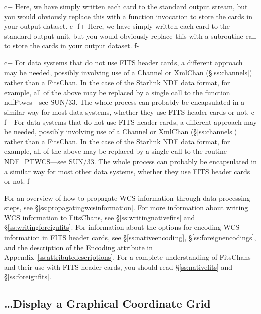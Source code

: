 \documentclass[twoside,11pt]{article}
\newcommand{\xref}[3]{#1}
\newcommand{\appref}[1]{Appendix~\ref{#1}}
\newcommand{\secref}[1]{\S\ref{#1}}
\newcommand{\appref}[1]{\ref{#1}}
\newcommand{\secref}[1]{\ref{#1}}
\begin{document}
c+
Here, we have simply written each card to the standard output stream,
but you would obviously replace this with a function invocation to
store the cards in your output dataset.
c-
f+
Here, we have simply written each card to the standard output unit,
but you would obviously replace this with a subroutine call to store
the cards in your output dataset.
f-

c+
For data systems that do not use FITS header cards, a different
approach may be needed, possibly involving use of a Channel or XmlChan
(\secref{ss:channels}) rather than a FitsChan.  In the case of the
Starlink NDF data format, for example, all of the above may be
replaced by a single call to the function
\xref{ndfPtwcs}{sun33}{ndfPtwcs}---see \xref{SUN/33}{sun33}{}. The
whole process can probably be encapsulated in a similar way for most
data systems, whether they use FITS header cards or not.
c-
f+
For data systems that do not use FITS header cards, a different
approach may be needed, possibly involving use of a Channel or XmlChan
(\secref{ss:channels}) rather than a FitsChan.  In the case of the
Starlink NDF data format, for example, all of the above may be
replaced by a single call to the routine
\xref{NDF\_PTWCS}{sun33}{NDF_PTWCS}---see \xref{SUN/33}{sun33}{}. The
whole process can probably be encapsulated in a similar way for most
other data systems, whether they use FITS header cards or not.
f-

For an overview of how to propagate WCS information through data
processing steps, see \secref{ss:propagatingwcsinformation}.  For more
information about writing WCS information to FitsChans, see
\secref{ss:writingnativefits} and \secref{ss:writingforeignfits}.  For
information about the options for encoding WCS information in FITS
header cards, see \secref{ss:nativeencoding},
\secref{ss:foreignencodings}, and the description of the Encoding
attribute in \appref{ss:attributedescriptions}.  For a complete
understanding of FitsChans and their use with FITS header cards, you
should read \secref{ss:nativefits} and \secref{ss:foreignfits}.

\subsection{\label{ss:howtoplotgrid}\ldots Display a Graphical Coordinate Grid}
\end{document}
